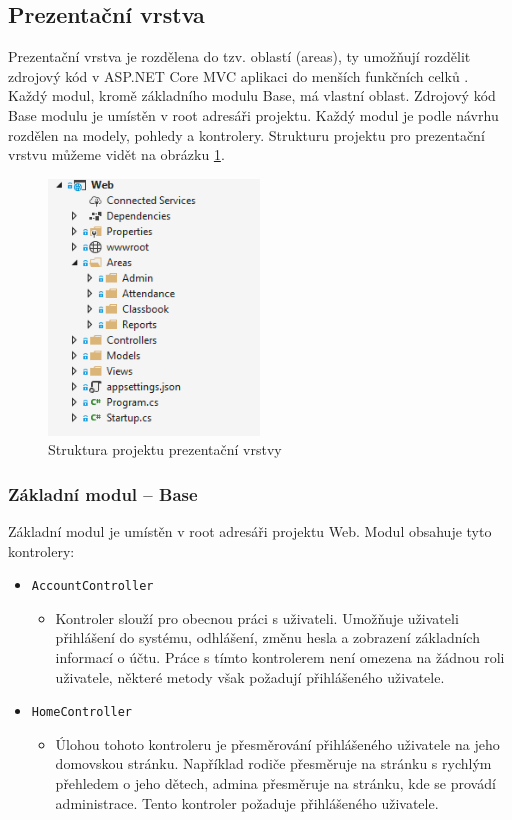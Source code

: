\subsection{Prezentační vrstva}
Prezentační vrstva je rozdělena do tzv. oblastí (areas), ty umožňují rozdělit zdrojový kód v ASP.NET Core MVC aplikaci do menších funkčních celků \cite{areas}. Každý modul, kromě základního modulu Base, má vlastní oblast. Zdrojový kód Base modulu je umístěn v root adresáři projektu. Každý modul je podle návrhu rozdělen na modely, pohledy a kontrolery. Strukturu projektu pro prezentační vrstvu můžeme vidět na obrázku \ref{struktura-projektu}.
\clearpage

\begin{figure}[h]
	\centering
	\includegraphics[width=0.5\textwidth]{images/struktura_projektu.png}
	\caption{Struktura projektu prezentační vrstvy}
	\label{struktura-projektu}
\end{figure}

\subsubsection{Základní modul -- Base}
Základní modul je umístěn v root adresáři projektu Web. Modul obsahuje tyto kontrolery:
\begin{itemize}
    \item \texttt{AccountController}
    \begin{itemize}
        \item Kontroler slouží pro obecnou práci s uživateli. Umožňuje uživateli přihlášení do systému, odhlášení, změnu hesla a zobrazení základních informací o účtu. Práce s tímto kontrolerem není omezena na žádnou roli uživatele, některé metody však požadují přihlášeného uživatele.
    \end{itemize}
    \item \texttt{HomeController}
    \begin{itemize}
        \item Úlohou tohoto kontroleru je přesměrování přihlášeného uživatele na jeho domovskou stránku. Například rodiče přesměruje na stránku s rychlým přehledem o jeho dětech, admina přesměruje na stránku, kde se provádí administrace. Tento kontroler požaduje přihlášeného uživatele.
    \end{itemize}
\end{itemize}

